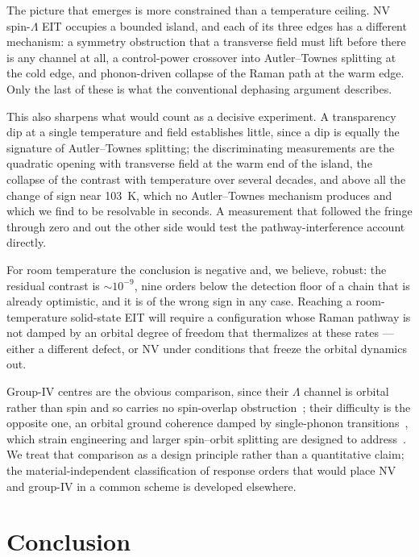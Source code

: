 \documentclass[
  reprint,
  amsmath,amssymb,
  aps,pra,
  superscriptaddress,
  floatfix,
]{revtex4-2}
\begin{document}
The picture that emerges is more constrained than a temperature ceiling. NV
spin-$\Lambda$ EIT occupies a bounded island, and each of its three edges has
a different mechanism: a symmetry obstruction that a transverse field must
lift before there is any channel at all, a control-power crossover into
Autler--Townes splitting at the cold edge, and phonon-driven collapse of the
Raman path at the warm edge. Only the last of these is what the conventional
dephasing argument describes.

This also sharpens what would count as a decisive experiment. A transparency
dip at a single temperature and field establishes little, since a dip is
equally the signature of Autler--Townes splitting; the discriminating
measurements are the quadratic opening with transverse field at the warm end
of the island, the collapse of the contrast with temperature over several
decades, and above all the change of sign near \SI{103}{\kelvin}, which no
Autler--Townes mechanism produces and which we find to be resolvable in
seconds. A measurement that
followed the fringe through zero and out the other side would test the
pathway-interference account directly.

For room temperature the conclusion is negative and, we believe, robust: the
residual contrast is $\sim\!10^{-9}$, nine orders below the detection floor of
a chain that is already optimistic, and it is of the wrong sign in any case.
Reaching a room-temperature solid-state EIT will require a configuration whose
Raman pathway is not damped by an orbital degree of freedom that thermalizes
at these rates --- either a different defect, or NV under conditions that
freeze the orbital dynamics out.

Group-IV centres are the obvious comparison, since their $\Lambda$ channel is
orbital rather than spin and so carries no spin-overlap
obstruction~\cite{B2014A01,L2014A02,I2024S13}; their difficulty is the
opposite one, an orbital ground coherence damped by single-phonon
transitions~\cite{K2015S11}, which strain engineering and larger spin--orbit
splitting are designed to address~\cite{S2018S12,R2021A04}. We treat that
comparison as a design principle rather than a quantitative claim; the
material-independent classification of response orders that would place NV and
group-IV in a common scheme is developed elsewhere.

\section{Conclusion}
\end{document}
